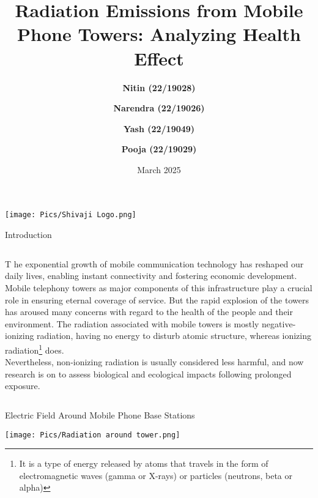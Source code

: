 \documentclass[7pt, aspectratio=169]{beamer}
\title{Radiation Emissions from Mobile Phone Towers: Analyzing Health Effect}
\author{\textbf{Nitin (22/19028)} \inst{1} \and \textbf{Narendra (22/19026)} \inst{1} \and \textbf{Yash (22/19049)} \inst{1}\\ \and \textbf{Pooja (22/19029)} \inst{1}}
\institute{
  \inst{1} Department of Physics, Shivaji College Delhi University
}
\date{March 2025}
\begin{document}
\begin{frame}
  \titlepage
  \begin{center}
        \texttt{[image: Pics/Shivaji Logo.png]}
  \end{center}
\end{frame}

\begin{frame}{Introduction}
\begin{columns}
     \lettrine{T}{} he exponential growth of mobile communication technology has reshaped our daily lives, enabling instant connectivity and fostering economic development.\\
    \vspace{0.1cm}
    Mobile telephony towers as major components of this infrastructure play a crucial role in ensuring eternal coverage of service. But the rapid explosion of the towers has aroused many concerns with regard to the health of the people and their environment.
     The radiation associated with mobile towers is mostly negative-ionizing radiation, having no energy to disturb atomic structure, whereas ionizing radiation\footnote{It is a type of energy released by atoms that travels in the form of electromagnetic waves (gamma or X-rays) or particles (neutrons, beta or alpha)} does.\\
    \vspace{0.1cm}
    Nevertheless, non-ionizing radiation is usually considered less harmful, and now research is on to assess biological and ecological impacts following prolonged exposure.
\end{columns}
    
\end{frame}

\begin{frame}{Electric Field Around Mobile Phone Base Stations}
\begin{center}
    \texttt{[image: Pics/Radiation around tower.png]}
\end{center}
    
\end{frame}
\end{document}
